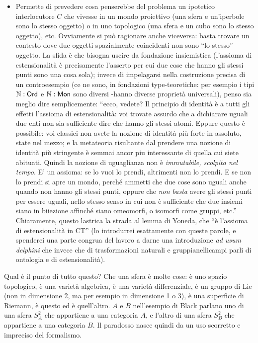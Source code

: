 \begin{itemize}
	\item Permette di prevedere cosa penserebbe del problema un ipotetico interlocutore $C$ che vivesse in un mondo proiettivo (una sfera e un'iperbole sono lo stesso oggetto) o in uno topologico (una sfera e un cubo sono lo stesso oggetto), etc. Ovviamente si può ragionare anche viceversa: basta trovare un contesto dove due oggetti spazialmente coincidenti non sono ``lo stesso'' oggetto. La sfida è che bisogna uscire da fondazione insiemistica (l'assioma di estensionalità è precisamente l'asserto per cui due cose che hanno gli stessi punti sono una cosa sola); invece di impelagarsi nella costruzione precisa di un controesempio (ce ne sono, in fondazioni type-teoretiche: per esempio i tipi $\mathbb N : \sf Ord$ e $\mathbb N : \sf Mon$ sono diversi -hanno diverse proprietà universali), penso sia meglio dire semplicemente: ``ecco, vedete? Il principio di identità è  a tutti gli effetti l'assioma di estensionalità: voi trovate assurdo che a dichiarare uguali due enti non sia sufficiente dire che hanno gli stessi atomi. Eppure questo è possibile: voi classici non avete la nozione di identità più forte in assoluto, state nel mezzo; e la metateoria risultante dal prendere una nozione di identità più stringente è semmai ancor piu interessante di quella cui siete abituati. Quindi la nozione di uguaglianza non è \emph{immutabile, scolpita nel tempo}. E' un assioma: se lo vuoi lo prendi, altrimenti non lo prendi. E se non lo prendi si apre un mondo, perché ammetti che due cose sono uguali anche quando non hanno gli stessi punti, oppure che \emph{non basta} avere gli stessi punti per essere uguali, nello stesso senso in cui non è sufficiente che due insiemi siano in biiezione affinché siano omeomorfi, o isomorfi come gruppi, etc.'' Chiaramente, questo lastrica la strada al lemma di Yoneda, che ``è l'assioma di estensionalità in CT'' (lo introdurrei esattamente con queste parole, e spenderei una parte congrua del lavoro a darne una introduzione \emph{ad usum delphini} che invece che di trasformazioni naturali e gruppianellicampi parli di ontologia e di estensionalità).
\end{itemize}
Qual è il punto di tutto questo? Che una sfera è molte cose: è uno spazio topologico, è una varietà algebrica, è una varietà differenziale, è un gruppo di Lie (non in dimensione 2, ma per esempio in dimensione 1 o 3), è una superficie di Riemann, è questo ed è quell'altro. $A$ e $B$ nell'esempio di Black parlano uno di una sfera $S^2_A$ che appartiene a una categoria $A$, e l'altro di una sfera $S^2_B$ che appartiene a una categoria $B$. Il paradosso nasce quindi da un uso scorretto e impreciso del formalismo.